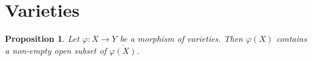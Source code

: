 \documentclass[]{pcmi}
\theoremstyle{plain}
\newtheorem{Proposition}[equation]{Proposition}
\theoremstyle{definition}
\begin{document}
\section{Varieties}

\begin{Proposition}\label{prop:1.6}
    Let $\varphi : X \to Y$ be a morphism of varieties. Then $\varphi(X)$ contains a non-empty open subset of $\overline{\varphi(X)}$. 
\end{Proposition}
%    
%
%
%
%             
%   
%
%  

\bibspread




\vfill\eject
\end{document}
